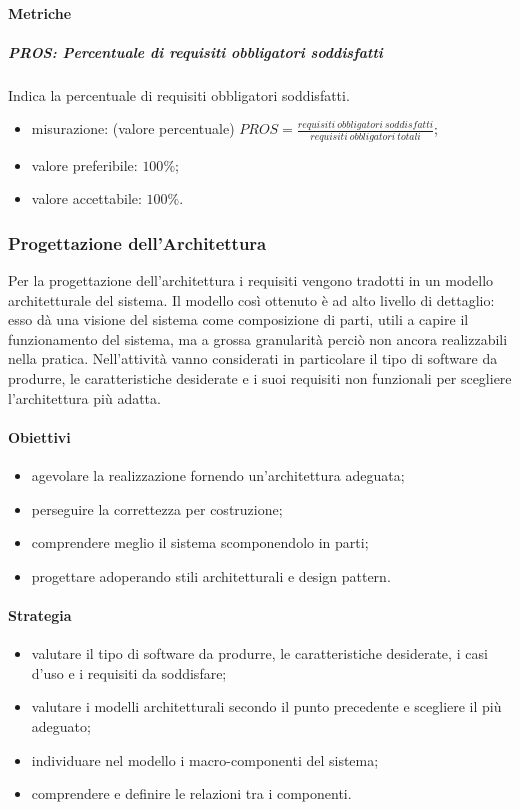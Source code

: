 		\paragraph{Metriche}
			\subparagraph{PROS: Percentuale di requisiti obbligatori soddisfatti} Indica la percentuale di requisiti obbligatori soddisfatti.
			\begin{itemize}
				\item misurazione: (valore percentuale) $ PROS = \frac{requisiti\ obbligatori\ soddisfatti}{requisiti\ obbligatori\ totali}$;
				\item valore preferibile: $100\%$;
				\item valore accettabile: $100\%$.
			\end{itemize}
		
	\subsubsection{Progettazione dell'Architettura}
	Per la progettazione  dell'architettura i requisiti vengono tradotti in un modello architetturale del sistema.
	Il modello così ottenuto è ad alto livello di dettaglio: esso dà una visione del sistema come composizione di parti, utili a capire il funzionamento del sistema, ma a grossa granularità perciò non ancora realizzabili nella pratica.\newline
	Nell'attività vanno considerati in particolare il tipo di software da produrre, le caratteristiche desiderate e i suoi requisiti non funzionali per scegliere l'architettura più adatta.
		\paragraph{Obiettivi}
		\begin{itemize}
			\item agevolare la realizzazione fornendo un'architettura adeguata;
			\item perseguire la correttezza per costruzione;
			\item comprendere meglio il sistema scomponendolo in parti;
			\item progettare adoperando stili architetturali e design pattern.
		\end{itemize}
		\paragraph{Strategia}
		\begin{itemize}
			\item valutare il tipo di software da produrre, le caratteristiche desiderate, i casi d'uso e i requisiti da soddisfare;
			\item valutare i modelli architetturali secondo il punto precedente e scegliere il più adeguato;
			\item individuare nel modello i macro-componenti del sistema;
			\item comprendere e definire le relazioni tra i componenti.
		\end{itemize}
